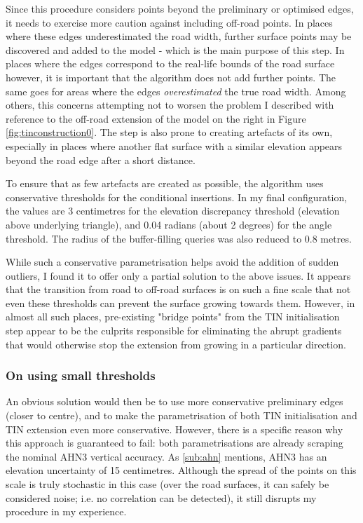 Since this procedure considers points beyond the preliminary or optimised edges, it needs to exercise more caution against including off-road points. In places where these edges underestimated the road width, further surface points may be discovered and added to the model - which is the main purpose of this step. In places where the edges correspond to the real-life bounds of the road surface however, it is important that the algorithm does not add further points. The same goes for areas where the edges \textit{overestimated} the true road width. Among others, this concerns attempting not to worsen the problem I described with reference to the off-road extension of the model on the right in Figure \ref{fig:tinconstruction0}. The step is also prone to creating artefacts of its own, especially in places where another flat surface with a similar elevation appears beyond the road edge after a short distance.

To ensure that as few artefacts are created as possible, the algorithm uses conservative thresholds for the conditional insertions. In my final configuration, the values are 3 centimetres for the elevation discrepancy threshold (elevation above underlying triangle), and 0.04 radians (about 2 degrees) for the angle threshold. The radius of the buffer-filling queries was also reduced to 0.8 metres.

While such a conservative parametrisation helps avoid the addition of sudden outliers, I found it to offer only a partial solution to the above issues. It appears that the transition from road to off-road surfaces is on such a fine scale that not even these thresholds can prevent the surface growing towards them. However, in almost all such places, pre-existing "bridge points" from the TIN initialisation step appear to be the culprits responsible for eliminating the abrupt gradients that would otherwise stop the extension from growing in a particular direction.

\subsubsection{On using small thresholds}

An obvious solution would then be to use more conservative preliminary edges (closer to centre), and to make the parametrisation of both TIN initialisation and TIN extension even more conservative. However, there is a specific reason why this approach is guaranteed to fail: both parametrisations are already scraping the nominal AHN3 vertical accuracy. As \ref{sub:ahn} mentions, AHN3 has an elevation uncertainty of 15 centimetres. Although the spread of the points on this scale is truly stochastic in this case (over the road surfaces, it can safely be considered noise; i.e. no correlation can be detected), it still disrupts my procedure in my experience.

